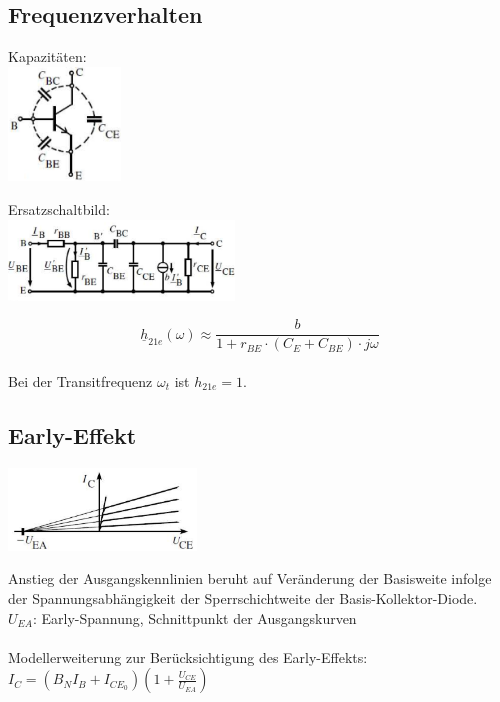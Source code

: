 	\subsection{Frequenzverhalten}
		\begin{minipage}{4cm}
			Kapazitäten: \\
			\includegraphics[width=3cm]{./images/bip-frequenz-cs}
		\end{minipage}	
		\begin{minipage}{6cm}
			Ersatzschaltbild: \\
			\includegraphics[width=6cm]{./images/bip-frequenz}
		\end{minipage}
		\begin{minipage}{6cm}
			\[ \underline{h}_{21e} (\omega) \approx \frac{b}{1 + r_{BE} \cdot \left(C_E + C_{BE} \right) \cdot j\omega} \] \\
			Bei der Transitfrequenz $\omega_t$ ist $h_{21e} = 1$.
		\end{minipage}
	
	\subsection{Early-Effekt}
		\begin{minipage}[c]{5cm}
			\includegraphics[width=5cm]{images/early-effekt}
		\end{minipage}
		\begin{minipage}[c]{12cm}
			Anstieg der Ausgangskennlinien beruht auf Veränderung der Basisweite infolge
			der Spannungsabhängigkeit der Sperrschichtweite der Basis-Kollektor-Diode. \\
			$U_{EA}$: Early-Spannung, Schnittpunkt der Ausgangskurven \\
			\\
			Modellerweiterung zur Berücksichtigung des Early-Effekts: \\
			$I_C = (B_NI_B+I_{CE_0})(1+\frac{U_{CE}}{U_{EA}})$
		\end{minipage}
				
